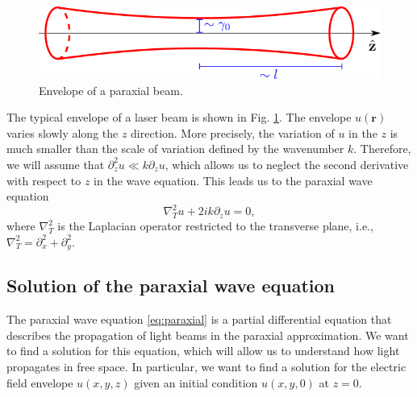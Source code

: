 \documentclass[a4paper,10pt]{report}
\begin{document}
\begin{figure}[]
    \includegraphics[scale=0.7]{images/feixe_paraxial.png}
    \centering
    \caption{Envelope of a paraxial beam.}
    \label{fig: paraxial beam}
\end{figure}

The typical envelope of a laser beam is shown in Fig. \ref{fig: paraxial beam}. The envelope $u(\mathbf{r})$ varies slowly along the $z$ direction. More precisely, the variation of $u$ in the $z$ is much smaller than the scale of variation defined by the wavenumber $k$. Therefore, we will assume that $\partial_z^2 u \ll k \partial_z u$, which allows us to neglect the second derivative with respect to $z$ in the wave equation. This leads us to the paraxial wave equation
\begin{equation}
\label{eq:paraxial}
    \nabla^2_T u + 2ik \partial_z u = 0,
\end{equation}
where $\nabla^2_T$ is the Laplacian operator restricted to the transverse plane, i.e., $\nabla^2_T = \partial_x^2 + \partial_y^2$.

\subsection{Solution of the paraxial wave equation}

The paraxial wave equation \eqref{eq:paraxial} is a partial differential equation that describes the propagation of light beams in the paraxial approximation. We want to find a solution for this equation, which will allow us to understand how light propagates in free space. In particular, we want to find a solution for the electric field envelope $u(x,y,z)$ given an initial condition $u(x,y,0)$ at $z=0$.
\end{document}
